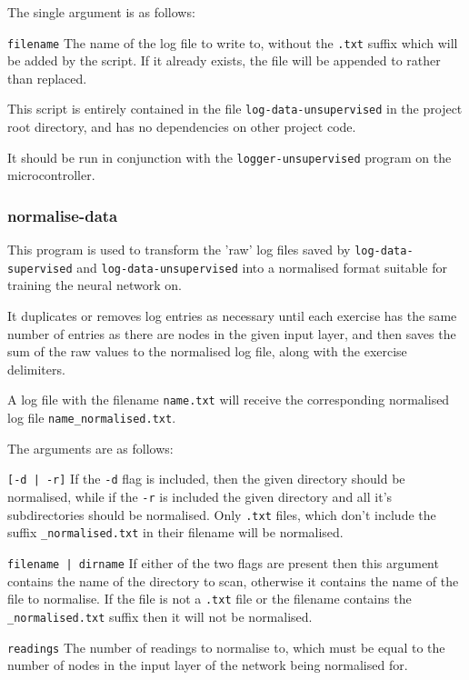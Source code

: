 \documentclass[a4paper]{article}
\begin{document}
The single argument is as follows:

\lstinline{filename} The name of the log file to write to, without the \lstinline{.txt} suffix which will be added by the script. If it already exists, the file will be appended to rather than replaced.

This script is entirely contained in the file \lstinline{log-data-unsupervised} in the project root directory, and has no dependencies on other project code.

It should be run in conjunction with the \lstinline{logger-unsupervised} program on the microcontroller.

\subsubsection{normalise-data}

This program is used to transform the 'raw' log files saved by \lstinline{log-data-supervised} and \lstinline{log-data-unsupervised} into a normalised format suitable for training the neural network on. 

It duplicates or removes log entries as necessary until each exercise has the same number of entries as there are nodes in the given input layer, and then saves the sum of the raw values to the normalised log file, along with the exercise delimiters.

A log file with the filename \lstinline{name.txt} will receive the corresponding normalised log file \lstinline{name_normalised.txt}.

The arguments are as follows:

\lstinline{[-d | -r]} If the \lstinline{-d} flag is included, then the given directory should be normalised, while if the \lstinline{-r} is included the given directory and all it's subdirectories should be normalised. Only \lstinline{.txt} files, which don't include the suffix \lstinline{_normalised.txt} in their filename will be normalised.

\lstinline{filename | dirname} If either of the two flags are present then this argument contains the name of the directory to scan, otherwise it contains the name of the file to normalise. If the file is not a \lstinline{.txt} file or the filename contains the \lstinline{_normalised.txt} suffix then it will not be normalised.

\lstinline{readings} The number of readings to normalise to, which must be equal to the number of nodes in the input layer of the network being normalised for.
\end{document}
